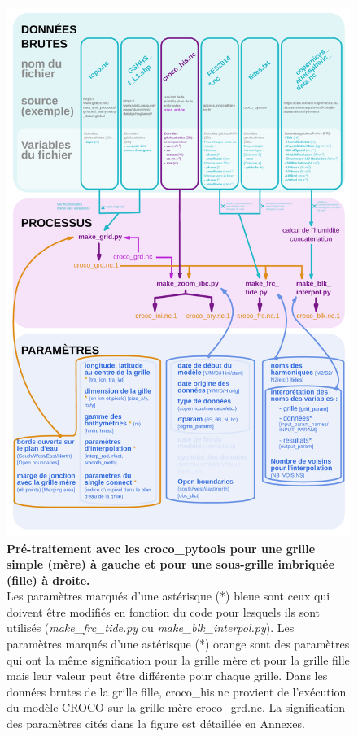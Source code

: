 \documentclass[10pt,a4paper,titlepage]{article}
\begin{document}
\begin{figure}[h]
\begin{center}
        \includegraphics[scale=0.35]{../images/workflow/graphe_data_process_fille_zoom.pdf}
        \caption{
            \textbf{Pré-traitement avec les croco\_pytools pour une grille simple ({\color{workColor}mère}) à gauche et pour une sous-grille imbriquée ({\color{orange}fille}) à droite.}
            \\Les paramètres marqués d'une {\color{paramColor}astérisque (*) bleue} sont ceux qui doivent être modifiés en fonction du code pour lesquels ils sont utilisés (\textit{make\_frc\_tide.py} ou \textit{make\_blk\_interpol.py}).
            Les paramètres marqués d'une {\color{orange}astérisque (*) orange} sont des paramètres qui ont la même signification pour la grille mère et pour la grille fille mais leur valeur peut être différente pour chaque grille.
            Dans les données brutes de la grille fille, {\color{outputColor}croco\_his.nc} provient de l'exécution du modèle CROCO sur la grille mère {\color{workColor}croco\_grd.nc}.
            La signification des paramètres cités dans la figure est détaillée en Annexes.
        }
        \label{workflow_prepro_main}
    \end{center}
\end{figure}
\end{document}
